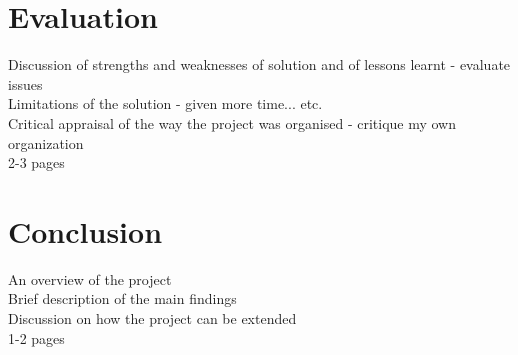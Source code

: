 \documentclass[12pt,a4paper]{article}
\begin{document}
\section{Evaluation}

Discussion of strengths and weaknesses of solution and of lessons learnt - evaluate issues\\
Limitations of the solution - given more time... etc.\\
Critical appraisal of the way the project was organised - critique my own organization\\
2-3 pages

\section{Conclusion}

An overview of the project\\
Brief description of the main findings\\
Discussion on how the project can be extended\\
1-2 pages



\nocite{*}
\end{document}
